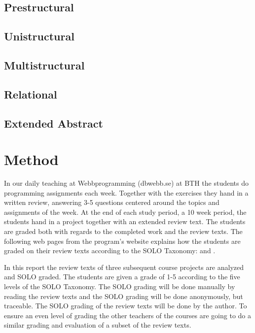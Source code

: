 \documentclass[twoside,twocolumn,a4paper,11pt,english]{article}
\begin{document}
\subsection{Prestructural}

\subsection{Unistructural}

\subsection{Multistructural}

\subsection{Relational}

\subsection{Extended Abstract}




\section{Method}

In our daily teaching at Webbprogramming (dbwebb.se) at BTH the students do programming assignments each week. Together with the exercises they hand in a written review, answering 3-5 questions centered around the topics and assignments of the week. At the end of each study period, a 10 week period, the students hand in a project together with an extended review text. The students are graded both with regards to the completed work and the review texts. The following web pages from the program's website explains how the students are graded on their review texts according to the SOLO Taxonomy: \cite{redovisning} and \cite{solo}.

In this report the review texts of three subsequent course projects are analyzed and SOLO graded. The students are given a grade of 1-5 according to the five levels of the SOLO Taxonomy. The SOLO grading will be done manually by reading the review texts and the SOLO grading will be done anonymously, but traceable. The SOLO grading of the review texts will be done by the author. To ensure an even level of grading the other teachers of the courses are going to do a similar grading and evaluation of a subset of the review texts.
\end{document}
